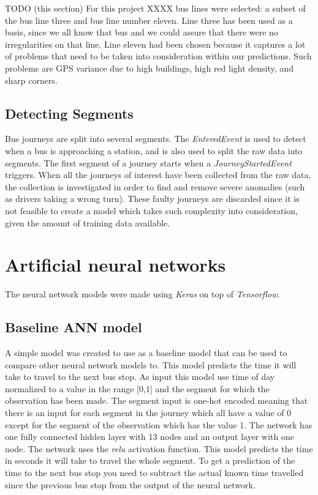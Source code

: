 TODO (this section) For this project XXXX bus lines were selected: a subset of the bus line three and bus line number eleven. Line three has been used as a basis, since we all know that bus and we could assure that there were no irregularities on that line. Line eleven had been chosen because it captures a lot of problems that need to be taken into consideration within our predictions. Such problems are GPS variance due to high buildings, high red light density, and sharp corners. 

\subsection{Detecting Segments}
Bus journeys are split into several segments. The \textit{EnteredEvent} is used to detect when a bus is approaching a station, and is also used to split the raw data into segments. The first segment of a journey starts when a \textit{JourneyStartedEvent} triggers. When all the journeys of interest have been collected from the raw data, the collection is investigated in order to find and remove severe anomalies (such as drivers taking a wrong turn). These faulty journeys are discarded since it is not feasible to create a model which takes such complexity into consideration, given the amount of training data available.

\section{Artificial neural networks}
The neural network models were made using \textit{Keras} on top of \textit{Tensorflow}.

\subsection{Baseline ANN model}
A simple model was created to use as a baseline model that can be used to compare other neural network models to. This model predicts the time it will take to travel to the next bus stop. As input this model use time of day normalized to a value in the range [0,1] and the segment for which the observation has been made. The segment input is one-hot encoded meaning that there is an input for each segment in the journey which all have a value of 0 except for the segment of the observation which has the value 1. The network has one fully connected hidden layer with 13 nodes and an output layer with one node. The network uses the \textit{relu} activation function.
This model predicts the time in seconds it will take to travel the whole segment. To get a prediction of the time to the next bus stop you need to subtract the actual known time travelled since the previous bus stop from the output of the neural network.

